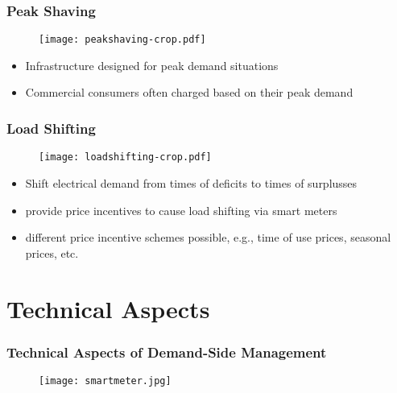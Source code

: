 \documentclass[10pt,aspectratio=169,dvipsnames]{beamer}
\let\olditem\item
\renewcommand{\item}{%
\olditem\vspace{5pt}}
\begin{document}
\begin{frame}
 \frametitle{Peak Shaving}

  \begin{minipage}[t]{0.5\textwidth}
     \begin{figure}
  \texttt{[image: peakshaving-crop.pdf]}
  \end{figure}
\end{minipage}\hfill
\begin{minipage}[t]{0.5\textwidth}
\begin{itemize}
\item Infrastructure designed for peak demand situations
\item Commercial consumers often charged based on their peak demand
\end{itemize}
\end{minipage}

\end{frame}

\begin{frame}
 \frametitle{Load Shifting}

   \begin{minipage}[t]{0.5\textwidth}
     \begin{figure}
  \texttt{[image: loadshifting-crop.pdf]}
  \end{figure}
\end{minipage}\hfill
\begin{minipage}[t]{0.5\textwidth}
\begin{itemize}
\item Shift electrical demand from times of deficits to times of surplusses
\item  provide price incentives to cause load shifting via smart meters
\item different price incentive schemes possible, e.g., time of use prices, seasonal prices, etc.
\end{itemize}
\end{minipage}

\end{frame}
\section{Technical Aspects}
\begin{frame}
 \frametitle{Technical Aspects of Demand-Side Management}
   \begin{figure}
     \texttt{[image: smartmeter.jpg]}
  \end{figure}
\end{frame}
\end{document}
